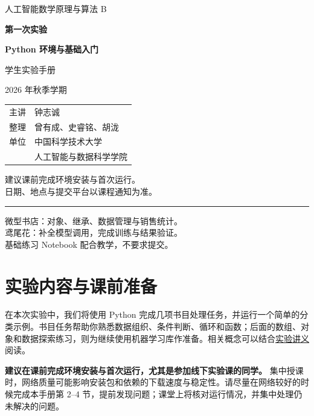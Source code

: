 \documentclass[UTF8,a4paper,11pt,fontset=fandol]{ctexart}
\begin{document}
\raggedright
\setlength{\parindent}{2em}
\hypersetup{pageanchor=false}
\begin{titlepage}
\thispagestyle{empty}
\vspace*{1.5cm}
{\Large\color{Navy}人工智能数学原理与算法 B\par}
\vspace{1cm}
{\huge\bfseries\color{Ink}第一次实验\par}
\vspace{.45cm}
{\LARGE\bfseries\color{Ink}Python 环境与基础入门\par}
\vspace{.6cm}
{\Large 学生实验手册\par}
\vspace{1cm}
{\large 2026 年秋季学期\par}
\vspace{.8cm}
\begin{tabular}{@{}ll}
主讲 & 钟志诚\\[.35em]
整理 & 曾有成、史睿铭、胡泷\\[.35em]
单位 & 中国科学技术大学\\
     & 人工智能与数据科学学院
\end{tabular}
\vspace{1cm}\par
建议课前完成环境安装与首次运行。\\
日期、地点与提交平台以课程通知为准。\par
\vfill
\noindent\rule{\linewidth}{.5pt}\par
微型书店：对象、继承、数据管理与销售统计。\\
鸢尾花：补全模型调用，完成训练与结果验证。\\
基础练习 Notebook 配合教学，不要求提交。\par
\end{titlepage}
\hypersetup{pageanchor=true}
\tableofcontents
\clearpage
{}
\section{实验内容与课前准备}\label{ux5b9eux9a8cux5185ux5bb9ux4e0eux8bfeux524dux51c6ux5907}

在本次实验中，我们将使用 Python 完成几项书目处理任务，并运行一个简单的分类示例。书目任务帮助你熟悉数据组织、条件判断、循环和函数；后面的数组、对象和数据探索练习，则为继续使用机器学习库作准备。相关概念可以结合\href{实验01_实验讲义.md}{实验讲义}阅读。

\textbf{建议在课前完成环境安装与首次运行，尤其是参加线下实验课的同学。} 集中授课时，网络质量可能影响安装包和依赖的下载速度与稳定性。请尽量在网络较好的时候完成本手册第 2--4 节，提前发现问题；课堂上将核对运行情况，并集中处理仍未解决的问题。
\end{document}
